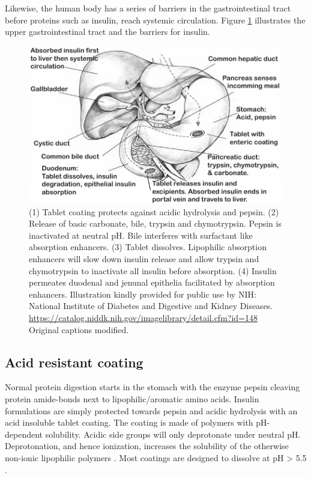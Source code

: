 Likewise, the human body has a series of barriers in the gastrointestinal tract before proteins such as insulin, reach systemic circulation. Figure \ref{intro_anatomy} illustrates the upper gastrointestinal tract and the barriers for insulin.

\begin{figure}[!htbp]
\includegraphics[width=\textwidth,height=\textheight,keepaspectratio]{graphics/intro_anatomy2.pdf}
\caption{(1) Tablet coating protects against acidic hydrolysis and pepsin. (2) Release of basic carbonate, bile, trypsin and chymotrypsin. Pepsin is inactivated at neutral pH. Bile interferes with surfactant like absorption enhancers. (3) Tablet dissolves. Lipophilic absorption enhancers will slow down insulin release and allow trypsin and chymotrypsin to inactivate all insulin before absorption. (4) Insulin permeates duodenal and jenunal epithelia facilitated by absorption enhancers. Illustration kindly provided for public use by NIH: National Institute of Diabetes and Digestive and Kidney Diseases. \url{https://catalog.niddk.nih.gov/imagelibrary/detail.cfm?id=148} Original captions modified.}
\label{intro_anatomy}
\end{figure}


\subsection{Acid resistant coating}
 Normal protein digestion starts in the stomach with the enzyme pepsin cleaving protein amide-bonds next to lipophilic/aromatic amino acids. Insulin formulations are simply protected towards pepsin and acidic hydrolysis with an acid insoluble tablet coating. The coating is made of polymers with pH-dependent solubility. Acidic side groups will only deprotonate under neutral pH. Deprotonation, and hence ionization, increases the solubility of the otherwise non-ionic lipophilic polymers \cite{carino1999oral,gabor2010improving}. Most coatings are designed to dissolve at pH > 5.5 \cite{maher2014formulation}.
 
